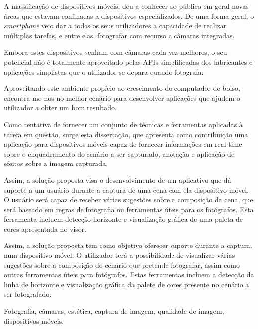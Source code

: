 \abstractPT 
{}

A massificação de dispositivos móveis, deu a conhecer ao público em geral novas áreas que estavam confinadas a dispositivos especializados. De uma forma geral, o \emph{smartphone} veio dar a todos os seus utilizadores a capacidade de realizar múltiplas tarefas, e entre elas, fotografar com recurso a câmaras integradas.


Embora estes dispositivos venham com câmaras cada vez melhores, o seu potencial não é totalmente aproveitado pelas APIs simplificadas dos fabricantes e aplicações simplistas que o utilizador se depara quando fotografa.


Aproveitando este ambiente propício ao crescimento do computador de bolso, encontra-mo-nos no melhor cenário para desenvolver aplicações que ajudem o utilizador a obter um bom resultado.


Como tentativa de fornecer um conjunto de técnicas e ferramentas aplicadas à tarefa em questão, surge esta dissertação, que apresenta como contribuição uma aplicação para dispositivos móveis capaz de fornecer informações em real-time sobre o enquadramento do cenário a ser capturado, anotação e aplicação de efeitos sobre a imagem capturada.



Assim, a solução proposta visa o desenvolvimento de um aplicativo que dá suporte a um usuário durante a captura de uma cena com ela dispositivo móvel. O usuário será capaz de receber várias sugestões sobre a composição da cena, que será baseado em regras de fotografia ou ferramentas úteis para os fotógrafos. Esta ferramenta incluem detecção horizonte e visualização gráfica de uma paleta de cores apresentada no visor.

Assim, a solução proposta tem como objetivo oferecer suporte durante a captura, num dispositivo móvel. O utilizador terá a possibilidade de visualizar várias sugestões sobre a composição do cenário que pretende fotografar, assim como outras ferramentas úteis para fotógrafos. Estas ferramentas incluem a detecção da linha de horizonte e visualização gráfica da palete de cores presente no cenário a ser fotografado.

\begin{keywords}
Fotografia, câmaras, estética, captura de imagem, qualidade de imagem, dispositivos móveis.
\end{keywords}
